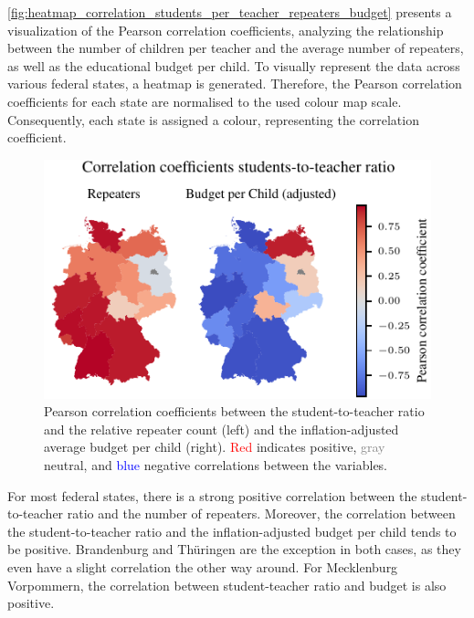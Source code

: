\autoref{fig:heatmap_correlation_students_per_teacher_repeaters_budget} presents a visualization of the Pearson correlation coefficients, analyzing the relationship between the number of children per teacher and the average number of repeaters, as well as the educational budget per child. To visually represent the data across various federal states, a heatmap is generated. Therefore, the Pearson correlation coefficients for each state are normalised to the used colour map scale. Consequently, each state is assigned a colour, representing the correlation coefficient.

\begin{figure}[h]
    \centering
    \includegraphics{fig/fig_heatmap_correlation_students_per_teacher_repeaters_budget.pdf}
    \caption{Pearson correlation coefficients between the student-to-teacher ratio and the relative repeater count (left) and the inflation-adjusted average budget per child (right). \textcolor{red}{Red} indicates positive, \textcolor{gray}{gray} neutral, and \textcolor{blue}{blue} negative correlations between the variables.}
    \label{fig:heatmap_correlation_students_per_teacher_repeaters_budget}
\end{figure}

For most federal states, there is a strong positive correlation between the student-to-teacher ratio and the number of repeaters. Moreover, the correlation between the student-to-teacher ratio and the inflation-adjusted budget per child tends to be positive. Brandenburg and Thüringen are the exception in both cases, as they even have a slight correlation the other way around. For Mecklenburg Vorpommern, the correlation between student-teacher ratio and budget is also positive.

